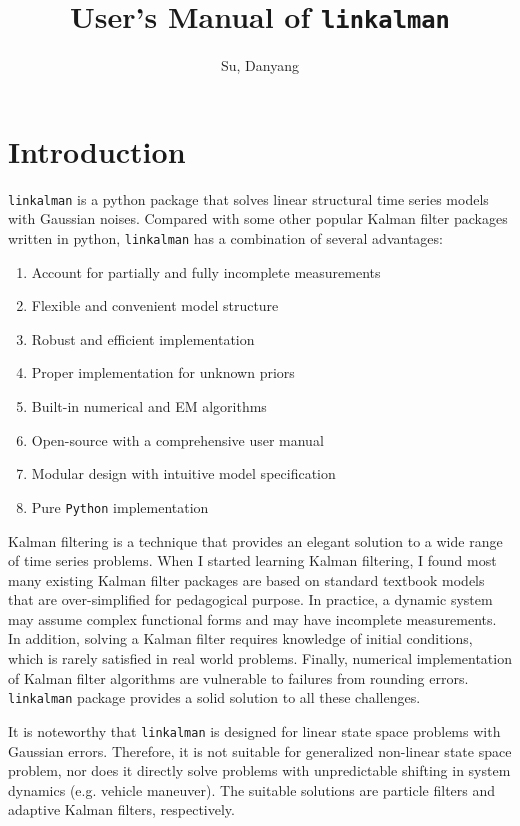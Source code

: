 \documentclass[10pt, titlepage]{article}
\title{User's Manual of \texttt{linkalman}}
\author{Su, Danyang}
\newenvironment{boenumerate}
    {\begin{enumerate}\renewcommand\labelenumi{\textbf\theenumi}}
    {\end{enumerate}}
\numberwithin{equation}{section}
\begin{document}
\maketitle
\thispagestyle{empty}
\clearpage
{}
\tableofcontents
\newpage
\section{Introduction}
\texttt{linkalman} is a python package that solves linear structural time series models with Gaussian noises. Compared with some other popular Kalman filter packages written in python, \texttt{linkalman} has a combination of several advantages:
\begin{boenumerate}
    \item Account for partially and fully incomplete measurements 
    \item Flexible and convenient model structure
    \item Robust and efficient implementation
    \item Proper implementation for unknown priors
    \item Built-in numerical and EM algorithms
    \item Open-source with a comprehensive user manual 
    \item Modular design with intuitive model specification
    \item Pure \texttt{Python} implementation 
\end{boenumerate}
Kalman filtering is a technique that provides an elegant solution to a wide range of time series problems. When I started learning Kalman filtering, I found most many existing Kalman filter packages are based on standard textbook models that are over-simplified for pedagogical purpose. In practice, a dynamic system may assume complex functional forms and may have incomplete measurements. In addition, solving a Kalman filter requires knowledge of initial conditions, which is rarely satisfied in real world problems. Finally, numerical implementation of Kalman filter algorithms are vulnerable to failures from rounding errors. \texttt{linkalman} package provides a solid solution to all these challenges. 

It is noteworthy that \texttt{linkalman} is designed for linear state space problems with Gaussian errors. Therefore, it is not suitable for generalized non-linear state space problem, nor does it directly solve problems with unpredictable shifting in system dynamics (e.g. vehicle maneuver). The suitable solutions are particle filters and adaptive Kalman filters, respectively.
\end{document}
